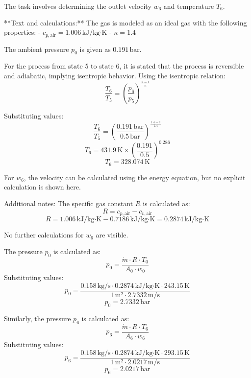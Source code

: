 The task involves determining the outlet velocity \( w_6 \) and temperature \( T_6 \).  

**Text and calculations:**  
The gas is modeled as an ideal gas with the following properties:  
- \( c_{p,\text{air}} = 1.006 \, \text{kJ/kg·K} \)  
- \( \kappa = 1.4 \)  

The ambient pressure \( p_0 \) is given as \( 0.191 \, \text{bar} \).  

For the process from state 5 to state 6, it is stated that the process is reversible and adiabatic, implying isentropic behavior. Using the isentropic relation:  
\[
\frac{T_6}{T_5} = \left( \frac{p_6}{p_5} \right)^{\frac{\kappa - 1}{\kappa}}
\]  

Substituting values:  
\[
\frac{T_6}{T_5} = \left( \frac{0.191 \, \text{bar}}{0.5 \, \text{bar}} \right)^{\frac{1.4 - 1}{1.4}}
\]  
\[
T_6 = 431.9 \, \text{K} \times \left( \frac{0.191}{0.5} \right)^{0.286}
\]  
\[
T_6 = 328.074 \, \text{K}
\]  

For \( w_6 \), the velocity can be calculated using the energy equation, but no explicit calculation is shown here.  

Additional notes:  
The specific gas constant \( R \) is calculated as:  
\[
R = c_{p,\text{air}} - c_{v,\text{air}}
\]  
\[
R = 1.006 \, \text{kJ/kg·K} - 0.7186 \, \text{kJ/kg·K} = 0.2874 \, \text{kJ/kg·K}
\]  

No further calculations for \( w_6 \) are visible.

The pressure \( p_0 \) is calculated as:  
\[
p_0 = \frac{\dot{m} \cdot R \cdot T_0}{A_0 \cdot w_0}
\]  
Substituting values:  
\[
p_0 = \frac{0.158 \, \text{kg/s} \cdot 0.2874 \, \text{kJ/kg·K} \cdot 243.15 \, \text{K}}{1 \, \text{m}^2 \cdot 2.7332 \, \text{m/s}}
\]  
\[
p_0 = 2.7332 \, \text{bar}
\]  

Similarly, the pressure \( p_6 \) is calculated as:  
\[
p_6 = \frac{\dot{m} \cdot R \cdot T_6}{A_6 \cdot w_6}
\]  
Substituting values:  
\[
p_6 = \frac{0.158 \, \text{kg/s} \cdot 0.2874 \, \text{kJ/kg·K} \cdot 293.15 \, \text{K}}{1 \, \text{m}^2 \cdot 2.0217 \, \text{m/s}}
\]  
\[
p_6 = 2.0217 \, \text{bar}
\]